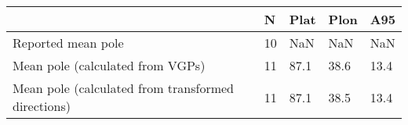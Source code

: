 \begin{tabular}{lllll}
\toprule
{} &   N &  Plat &  Plon &   A95 \\
\midrule
Reported mean pole                                 &  10 &   NaN &   NaN &   NaN \\
Mean pole (calculated from VGPs)                   &  11 &  87.1 &  38.6 &  13.4 \\
Mean pole (calculated from transformed directions) &  11 &  87.1 &  38.5 &  13.4 \\
\bottomrule
\end{tabular}
